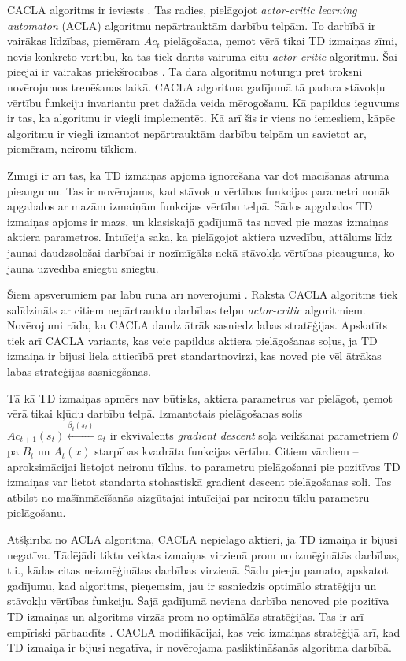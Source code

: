 \documentclass{ludis} %
\begin{document}
CACLA algoritms ir ieviests \autocite{Hasselt2007}. Tas radies, pielāgojot
\textit{actor-critic learning automaton} (ACLA) algoritmu nepārtrauktām darbību
telpām. To darbībā ir vairākas līdzības, piemēram $Ac_t$ pielāgošana, ņemot vērā
tikai TD izmaiņas zīmi, nevis konkrēto vērtību, kā tas tiek darīts vairumā citu
\textit{actor-critic} algoritmu. Šai pieejai ir vairākas priekšrocības
\autocite{Hasselt2007}. Tā dara algoritmu noturīgu pret troksni novērojumos
trenēšanas laikā. CACLA algoritma gadījumā tā padara stāvokļu vērtību funkciju
invariantu pret dažāda veida mērogošanu. Kā papildus ieguvums ir tas, ka
algoritmu ir viegli implementēt. Kā arī šis ir viens no iemesliem, kāpēc
algoritmu ir viegli izmantot nepārtrauktām darbību telpām un savietot ar,
piemēram, neironu tīkliem.

Zīmīgi ir arī tas, ka TD izmaiņas apjoma ignorēšana var dot mācīšanās ātruma
pieaugumu. Tas ir novērojams, kad stāvokļu vērtības funkcijas parametri nonāk
apgabalos ar mazām izmaiņām funkcijas vērtību telpā. Šādos apgabalos TD izmaiņas
apjoms ir mazs, un klasiskajā gadījumā tas noved pie mazas izmaiņas aktiera
parametros. Intuīcija saka, ka pielāgojot aktiera uzvedību, attālums līdz jaunai
daudzsološai darbībai ir nozīmīgāks nekā stāvokļa vērtības pieaugums, ko jaunā
uzvedība sniegtu sniegtu.

Šiem apsvērumiem par labu runā arī novērojumi \autocite{Hasselt2007}. Rakstā
CACLA algoritms tiek salīdzināts ar citiem nepārtrauktu darbības telpu
\textit{actor-critic} algoritmiem. Novērojumi rāda, ka CACLA daudz ātrāk
sasniedz labas stratēģijas. Apskatīts tiek arī CACLA variants, kas veic papildus
aktiera pielāgošanas soļus, ja TD izmaiņa ir bijusi liela attiecībā pret
standartnovirzi, kas noved pie vēl ātrākas labas stratēģijas sasniegšanas.

Tā kā TD izmaiņas apmērs nav būtisks, aktiera parametrus var pielāgot, ņemot
vērā tikai kļūdu darbību telpā. Izmantotais pielāgošanas solis $Ac_{t+1}(s_t)
\xleftarrow{\beta_t(s_t)} a_t$ ir ekvivalents \textit{gradient descent} soļa
veikšanai parametriem $\theta$ pa $B_t$ un $A_t(x)$ starpības kvadrāta funkcijas
vērtību. Citiem vārdiem -- aproksimācijai lietojot neironu tīklus, to parametru
pielāgošanai pie pozitīvas TD izmaiņas var lietot standarta stohastiskā
{gradient descent} pielāgošanas soli. Tas atbilst no mašīnmācīšanās aizgūtajai
intuīcijai par neironu tīklu parametru pielāgošanu.

Atšķirībā no ACLA algoritma, CACLA nepielāgo aktieri, ja TD izmaiņa ir bijusi
negatīva. Tādējādi tiktu veiktas izmaiņas virzienā prom no izmēģinātās darbības,
t.i., kādas citas neizmēģinātas darbības virzienā. Šādu pieeju pamato, apskatot
gadījumu, kad algoritms, pieņemsim, jau ir sasniedzis optimālo stratēģiju un
stāvokļu vērtības funkciju. Šajā gadījumā neviena darbība nenoved pie pozitīva
TD izmaiņas un algoritms virzās prom no optimālās stratēģijas. Tas ir arī
empīriski pārbaudīts \autocite{Hasselt2007}. CACLA modifikācijai, kas veic
izmaiņas stratēģijā arī, kad TD izmaiņa ir bijusi negatīva, ir novērojama
pasliktināšanās algoritma darbībā.
\end{document}
